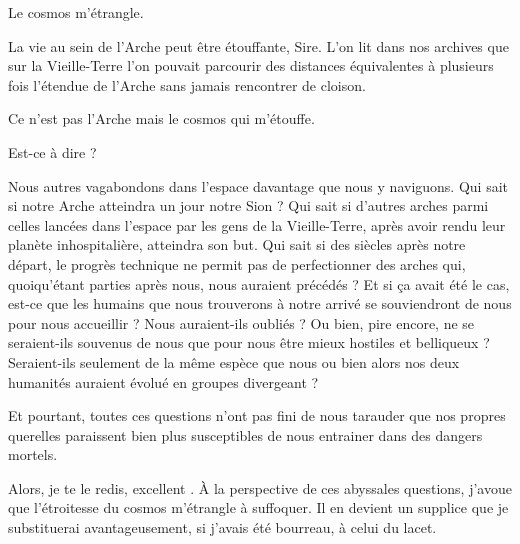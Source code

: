 \begin{drama}
  \elenaspeaks Le cosmos m’étrangle.

  \alexasspeaks La vie au sein de l’Arche peut être étouffante, Sire. L’on lit dans nos archives que sur la Vieille-Terre l’on pouvait parcourir des distances équivalentes à plusieurs fois l’étendue de l’Arche sans jamais rencontrer de cloison.

  \elenaspeaks Ce n’est pas l’Arche mais le cosmos qui m’étouffe.

  \alexasspeaks Est-ce à dire ?

  \elenaspeaks Nous autres vagabondons dans l’espace davantage que nous y naviguons. Qui sait si notre Arche atteindra un jour notre Sion ? Qui sait si d’autres arches parmi celles lancées dans l’espace par les gens de la Vieille-Terre, après avoir rendu leur planète inhospitalière, atteindra son but. Qui sait si des siècles après notre départ, le progrès technique ne permit pas de perfectionner des arches qui, quoiqu’étant parties après nous, nous auraient précédés ? Et si ça avait été le cas, est-ce que les humains que nous trouverons à notre arrivé se souviendront de nous pour nous accueillir ? Nous auraient-ils oubliés ? Ou bien, pire encore, ne se seraient-ils souvenus  de nous que pour nous être mieux hostiles et belliqueux ? Seraient-ils seulement de la même espèce que nous ou bien alors nos deux humanités auraient évolué en groupes divergeant ?

Et pourtant, toutes ces questions n’ont pas fini de nous tarauder que nos propres querelles paraissent bien plus susceptibles de nous entrainer dans des dangers mortels.

  Alors, je te le redis, excellent \alexas. À la perspective de ces abyssales questions, j’avoue que l’étroitesse du cosmos m’étrangle à suffoquer. Il en devient un supplice que je substituerai avantageusement, si j’avais été bourreau, à celui du lacet.
\end{drama}

\scene


\StageDirII{\elena, \roi, \kingsgards}



